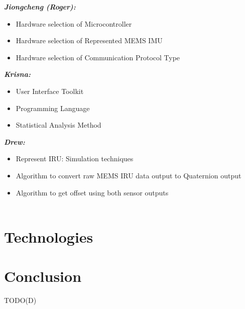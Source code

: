 \documentclass[letterpaper,10pt,onecolumn]{IEEEtran}
\begin{document}
\textit{\textbf{Jiongcheng (Roger):}}
\begin{itemize}
	\item Hardware selection of Microcontroller
	\item Hardware selection of Represented MEMS IMU
	\item Hardware selection of Communication Protocol Type
\end{itemize}

\textit{\textbf{Krisna:}}
\begin{itemize}
	\item User Interface Toolkit
	\item Programming Language
	\item Statistical Analysis Method
\end{itemize}

\textit{\textbf{Drew:}}
\begin{itemize}
	\item Represent IRU: Simulation techniques
	\item Algorithm to convert raw MEMS IRU data output to Quaternion output
	\item Algorithm to get offset using both sensor outputs\\\\
\end{itemize}



\section{Technologies}
	
	
	

\section{Conclusion}
TODO(D)


\newpage
\nocite{*}


\end{document}
